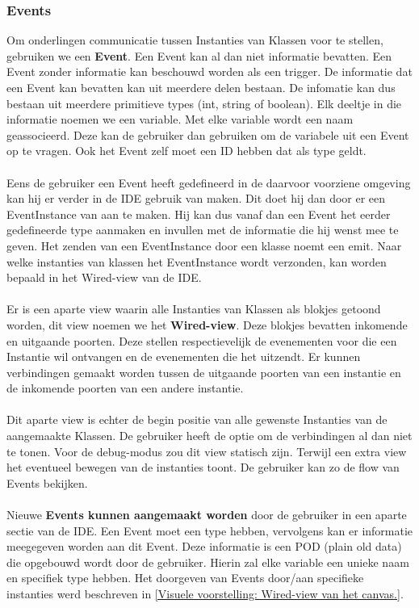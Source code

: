 \documentclass[]{article}
\begin{document}
\subsubsection{Events}
\label{Events}
Om onderlingen communicatie tussen Instanties van Klassen voor te stellen, gebruiken we een \textbf{Event}. Een Event kan al dan niet informatie bevatten. Een Event zonder informatie kan beschouwd worden als een trigger. De informatie dat een Event kan bevatten kan uit meerdere delen bestaan. De infomatie kan dus bestaan uit meerdere primitieve types (int, string of boolean). Elk deeltje in die informatie noemen we een variable. Met elke variable wordt een naam geassocieerd. Deze kan de gebruiker dan gebruiken om de variabele uit een Event op te vragen. Ook het Event zelf moet een ID hebben dat als type geldt.\\\\ Eens de gebruiker een Event heeft gedefineerd in de daarvoor voorziene omgeving kan hij er verder in de IDE gebruik van maken. Dit doet hij dan door er een EventInstance van aan te maken. Hij kan dus vanaf dan een Event het eerder gedefineerde type aanmaken en invullen met de informatie die hij wenst mee te geven. 
Het zenden van een EventInstance door een klasse noemt een emit. Naar welke instanties van klassen het EventInstance wordt verzonden, kan worden bepaald in het Wired-view van de IDE.\\\\
\label{Visuele voorstelling: Wired-view van het canvas.}
Er is een aparte view waarin alle Instanties van Klassen als blokjes getoond worden, dit view noemen we het \textbf{Wired-view}. Deze blokjes bevatten inkomende en uitgaande poorten. Deze stellen respectievelijk de evenementen voor die een Instantie wil ontvangen en de evenementen die het uitzendt. Er kunnen verbindingen gemaakt worden tussen de uitgaande poorten van een instantie en de inkomende poorten van een andere instantie.\\\\ 
Dit aparte view is echter de begin positie van alle gewenste Instanties van de aangemaakte Klassen. De gebruiker heeft de optie om de verbindingen al dan niet te tonen. Voor de debug-modus zou dit view statisch zijn. Terwijl een extra view het eventueel bewegen van de instanties toont. De gebruiker kan zo de flow van Events bekijken.\\\\  
Nieuwe \textbf{Events kunnen aangemaakt worden} door de gebruiker in een aparte sectie van de IDE. Een Event moet een type hebben, vervolgens kan er informatie meegegeven worden aan dit Event. Deze informatie is een POD (plain old data) die opgebouwd wordt door de gebruiker. Hierin zal elke variable een unieke naam en specifiek type hebben. Het doorgeven van Events door/aan specifieke instanties werd beschreven in \ref{Visuele voorstelling: Wired-view van het canvas.}. \\\\
  
\end{document}
